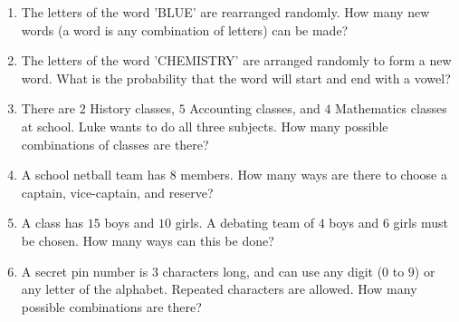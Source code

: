 \begin{enumerate}
\item The letters of the word 'BLUE' are rearranged randomly. How many new words (a word is any combination of letters) can be made?

\item The letters of the word 'CHEMISTRY' are arranged randomly to form a new word. What is the probability that the word will start and end with a vowel?

\item There are $2$ History classes, $5$ Accounting classes, and $4$ Mathematics classes at school. Luke wants to do all three subjects. How many possible combinations of classes are there?

\item A school netball team has $8$ members. How many ways are there to choose a captain, vice-captain, and reserve?

\item A class has $15$ boys and $10$ girls. A debating team of $4$ boys and $6$ girls must be chosen. How many ways can this be done?

\item A secret pin number is $3$ characters long, and can use any digit ($0$ to $9$) or any letter of the alphabet. Repeated characters are allowed. How many possible combinations are there?


\end{enumerate}









